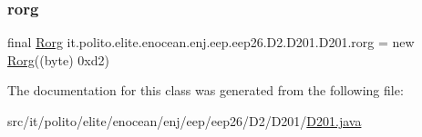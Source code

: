 \subsubsection{\texorpdfstring{rorg}{rorg}}
{\footnotesize\ttfamily final \hyperlink{classit_1_1polito_1_1elite_1_1enocean_1_1enj_1_1eep_1_1_rorg}{Rorg} it.\+polito.\+elite.\+enocean.\+enj.\+eep.\+eep26.\+D2.\+D201.\+D201.\+rorg = new \hyperlink{classit_1_1polito_1_1elite_1_1enocean_1_1enj_1_1eep_1_1_rorg}{Rorg}((byte) 0xd2)\hspace{0.3cm}{\ttfamily [static]}}



The documentation for this class was generated from the following file\+:\begin{DoxyCompactItemize}
\item 
src/it/polito/elite/enocean/enj/eep/eep26/\+D2/\+D201/\hyperlink{_d201_8java}{D201.\+java}\end{DoxyCompactItemize}
